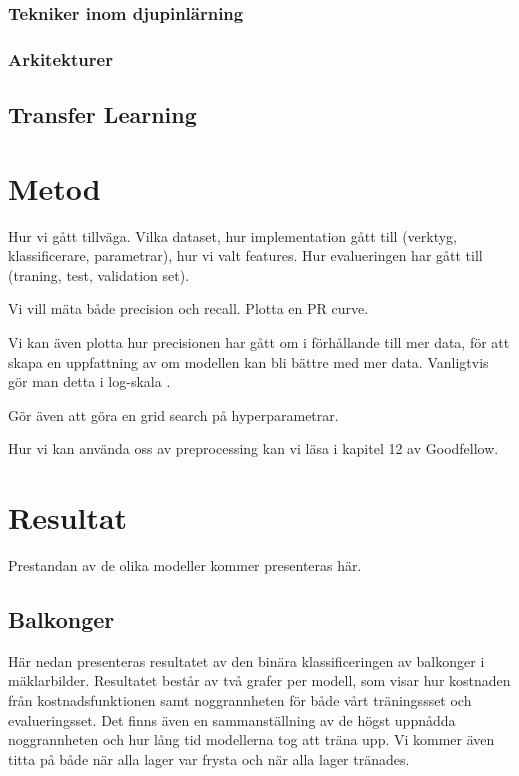 \documentclass{kththesis}
\begin{document}
    \subsection{Tekniker inom djupinlärning}

    \subsection{Arkitekturer}

  \section{Transfer Learning}



\chapter{Metod}
Hur vi gått tillväga. Vilka dataset, hur implementation gått till (verktyg, klassificerare, parametrar), hur vi valt features.
Hur evalueringen har gått till (traning, test, validation set).

Vi vill mäta både precision och recall. Plotta en PR curve.

Vi kan även plotta hur precisionen har gått om i förhållande till mer data, för att skapa en uppfattning av om modellen kan bli bättre med mer data. Vanligtvis gör man detta i log-skala \parencite{Goodfellow-et-al-2016}. 

Gör även att göra en grid search på hyperparametrar.

Hur vi kan använda oss av preprocessing kan vi  läsa i kapitel 12 av Goodfellow.

\chapter{Resultat}
Prestandan av de olika modeller kommer presenteras här.

  \section{Balkonger}
  Här nedan presenteras resultatet av den binära klassificeringen av balkonger i mäklarbilder.
  Resultatet består av två grafer per modell, som visar hur kostnaden från kostnadsfunktionen samt noggrannheten för både vårt träningssset och evalueringsset.
  Det finns även en sammanställning av de högst uppnådda noggrannheten och hur lång tid modellerna tog att träna upp.
  Vi kommer även titta på både när alla lager var frysta och när alla lager tränades.
\end{document}
